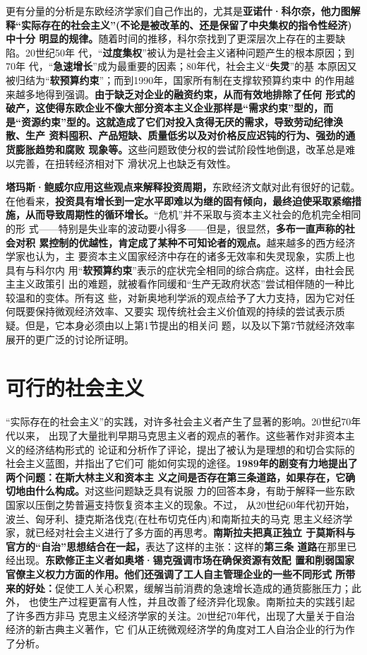 更有分量的分析是东欧经济学家们自己作出的，尤其是\textbf{亚诺什·科尔奈，他力图解
  释“实际存在的社会主义”(不论是被改革的、还是保留了中央集权的指令性经济)中十分
  明显的规律。}随着时间的推移，科尔奈找到了更深层次上存在的主要缺陷。20世纪50年
代，“\textbf{过度集权}”被认为是社会主义诸种问题产生的根本原因；到70年
代，“\textbf{急速增长}”成为最重要的因素；80年代，社会主义“\textbf{失灵}”的基
本原因又被归结为“\textbf{软预算约束}”；而到1990年，国家所有制在支撑软预算约束中
的作用越来越多地得到强调。\textbf{由于缺乏对企业的融资约束，从而有效地排除了任何
  形式的破产，这使得东欧企业不像大部分资本主义企业那样是“需求约束”型的，而
  是“资源约束”型的。这就造成了它们对投入贪得无厌的需求，导致劳动纪律涣散、生产
  资料囤积、产品短缺、质量低劣以及对价格反应迟钝的行为、强劲的通货膨胀趋势和腐败
  现象等。}这些问题致使分权的尝试阶段性地倒退，改革总是难以完善，在扭转经济相对下
滑状况上也缺乏有效性。

\textbf{塔玛斯·鲍威尔应用这些观点来解释投资周期，}东欧经济文献对此有很好的记载。
在他看来，\textbf{投资具有增长到一定水平即难以为继的固有倾向，最终迫使采取紧缩措
  施，从而导致周期性的循环增长。}“危机”并不采取与资本主义社会的危机完全相同的形
式——特别是失业率的波动要小得多——但是，很显然，\textbf{多布一直声称的社会对积
  累控制的优越性，肯定成了某种不可知论者的观点。}越来越多的西方经济学家也认为，主
要资本主义国家经济中存在的诸多无效率和失灵现象，实质上也具有与科尔内
用“\textbf{软预算约束}”表示的症状完全相同的综合病症。这样，由社会民主主义政策引
出的难题，就被看作同缓和“生产无政府状态”尝试相伴随的一种比较温和的变体。所有这
些，对新奥地利学派的观点给予了大力支持，因为它对任何既要保持微观经济效率、又要实
现传统社会主义价值观的持续的尝试表示质疑。但是，它本身必须由以上第1节提出的相关问
题，以及以下第7节就经济效率展开的更广泛的讨论所证明。

\section{可行的社会主义}

“实际存在的社会主义”的实践，对许多社会主义者产生了显著的影响。20世纪70年代以来，
出现了大量批判早期马克思主义者的观点的著作。这些著作对非资本主义的经济结构形式的
论证和分析作了评论，提出了被认为是理想的和切合实际的社会主义蓝图，并指出了它们可
能如何实现的途径。\textbf{1989年的剧变有力地提出了两个问题：在斯大林主义和资本主
  义之间是否存在第三条道路，如果存在，它确切地由什么构成。}对这些问题缺乏具有说服
力的回答本身，有助于解释一些东欧国家以压倒之势普遍支持恢复资本主义的现象。不过，
从20世纪60年代初开始，波兰、匈牙利、捷克斯洛伐克(在杜布切克任内)和南斯拉夫的马克
思主义经济学家，就已经对社会主义进行了多方面的再思考。\textbf{南斯拉夫把真正独立
  于莫斯科与官方的“自治”思想结合在一起，}表达了这样的主张：这样的\textbf{第三条
  道路}在那里已经出现。\textbf{东欧修正主义者如奥塔·锡克强调市场在确保资源有效配
  置和削弱国家官僚主义权力方面的作用。他们还强调了工人自主管理企业的一些不同形式
  所带来的好处：}促使工人关心积累，缓解当前消费的急速增长造成的通货膨胀压力；此外，
也使生产过程更富有人性，并且改善了经济异化现象。南斯拉夫的实践引起了许多西方非马
克思主义经济学家的关注。20世纪70年代，出现了大量关于自治经济的新古典主义著作，它
们从正统微观经济学的角度对工人自治企业的行为作了分析。

